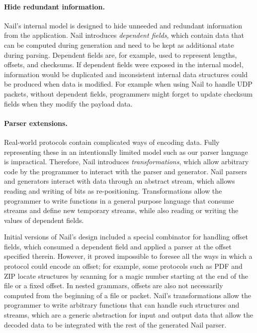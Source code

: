 \paragraph{Hide redundant information.}
Nail's internal model is designed to hide unneeded and redundant information from the application.
Nail introduces \emph{dependent fields}, which contain data that can be computed during generation
and need to be kept as additional state during parsing. Dependent fields are, for example, used to represent
lengths, offsets, and checksums. If dependent fields were exposed in the internal model, information
would be duplicated and inconsistent internal data structures could be produced when data is
modified. For example when using Nail to handle UDP packets, without dependent fields, programmers
might forget to update checksum fields when they modify the payload data.

\paragraph{Parser extensions.}
Real-world protocols contain complicated ways of encoding data. Fully representing these in an
intentionally limited model such as our parser language is impractical. Therefore, Nail introduces
\emph{transformations}, which allow arbitrary code by the programmer to interact with the parser and
generator. Nail parsers and generators interact with data through an abstract stream, which allows
reading and writing of bits as re-positioning. Transformations allow the programmer to write
functions in a general purpose language that consume streams and define new temporary streams, while
also reading or writing the values of dependent fields.

Initial versions of Nail's design included a special combinator for handling offset fields,
which consumed a dependent field and applied
a parser at the offset specified therein. However, it proved impossible to foresee all the ways in which a protocol could encode an offset;
for example, some protocols such as PDF and ZIP locate structures by scanning for a magic number starting at the
end of the file or a fixed offset. In nested grammars, offsets are also not necessarily computed from
the beginning of a file or packet.
Nail's transformations allow the programmer to write arbitrary functions that can
handle such structures and streams, which are a generic abstraction for input and
output data that allow the decoded data to be integrated with the rest of the
generated Nail parser.


